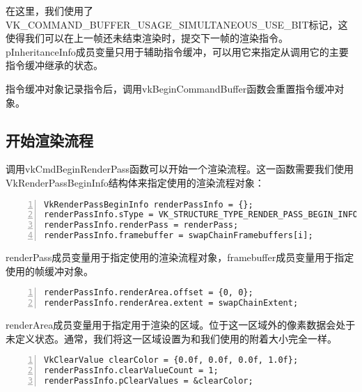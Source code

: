 \documentclass{ctexart}
\begin{document}
在这里，我们使用了VK\_COMMAND\_BUFFER\_USAGE\_SIMULTANEOUS\_USE\_BIT标记，这使得我们可以在上一帧还未结束渲染时，提交下一帧的渲染指令。pInheritanceInfo成员变量只用于辅助指令缓冲，可以用它来指定从调用它的主要指令缓冲继承的状态。

指令缓冲对象记录指令后，调用vkBeginCommandBuffer函数会重置指令缓冲对象。

\subsection{开始渲染流程}

调用vkCmdBeginRenderPass函数可以开始一个渲染流程。这一函数需要我们使用VkRenderPassBeginInfo结构体来指定使用的渲染流程对象：

\begin{lstlisting}[language={[ANSI]C},keywordstyle=\color{blue!70},commentstyle=\color{red!50!green!50!blue!50},frame=shadowbox, rulesepcolor=\color{red!20!green!20!blue!20},basicstyle=\small,numbers=left, numberstyle=\tiny,breaklines=true]
VkRenderPassBeginInfo renderPassInfo = {};
renderPassInfo.sType = VK_STRUCTURE_TYPE_RENDER_PASS_BEGIN_INFO;
renderPassInfo.renderPass = renderPass;
renderPassInfo.framebuffer = swapChainFramebuffers[i];
\end{lstlisting}

renderPass成员变量用于指定使用的渲染流程对象，framebuffer成员变量用于指定使用的帧缓冲对象。

\begin{lstlisting}[language={[ANSI]C},keywordstyle=\color{blue!70},commentstyle=\color{red!50!green!50!blue!50},frame=shadowbox, rulesepcolor=\color{red!20!green!20!blue!20},basicstyle=\small,numbers=left, numberstyle=\tiny,breaklines=true]
renderPassInfo.renderArea.offset = {0, 0};
renderPassInfo.renderArea.extent = swapChainExtent;
\end{lstlisting}

renderArea成员变量用于指定用于渲染的区域。位于这一区域外的像素数据会处于未定义状态。通常，我们将这一区域设置为和我们使用的附着大小完全一样。

\begin{lstlisting}[language={[ANSI]C},keywordstyle=\color{blue!70},commentstyle=\color{red!50!green!50!blue!50},frame=shadowbox, rulesepcolor=\color{red!20!green!20!blue!20},basicstyle=\small,numbers=left, numberstyle=\tiny,breaklines=true]
VkClearValue clearColor = {0.0f, 0.0f, 0.0f, 1.0f};
renderPassInfo.clearValueCount = 1;
renderPassInfo.pClearValues = &clearColor;
\end{lstlisting}
\end{document}
